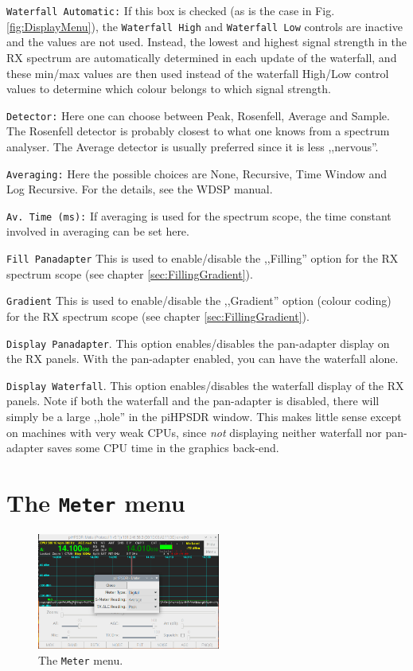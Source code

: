 \documentclass[12pt]{book}
\def\rett#1{\texttt{\color{red}#1}}
\def\bltt#1{\texttt{\color{blue}#1}}
\def\pH{pi\-HPSDR }
\begin{document}
\rett{Waterfall Automatic:} If this box is checked (as is the case in
Fig. \ref{fig:DisplayMenu}), the \rett{Waterfall High} and
\rett{Waterfall Low} controls are inactive and the values are not used. Instead,
the lowest and highest signal strength in the RX spectrum are automatically determined
in each update of the waterfall, and these min/max values
 are then used instead of the waterfall High/Low control values to determine which
 colour belongs to which signal strength.

\rett{Detector:} Here one can choose between Peak, Rosenfell, Average and Sample. The
Rosenfell detector is probably closest to what one knows from a spectrum analyser.
The Average detector is usually preferred since it is less ,,nervous''.

\rett{Averaging:} Here the possible choices are None, Recursive, Time Window and
Log Recursive. For the details, see the WDSP manual.

\rett{Av. Time (ms):} If averaging is used for the spectrum scope, the time
constant involved in averaging can be set here.

\rett{Fill Panadapter} This is used to enable/disable the ,,Filling'' option
for the RX  spectrum scope (see chapter \ref{sec:FillingGradient}).

\rett{Gradient} This is used to enable/disable the ,,Gradient'' option
(colour coding) for the RX spectrum scope (see chapter \ref{sec:FillingGradient}).

\rett{Display Panadapter}. This option enables/disables the pan-adapter display
on the RX panels. With the pan-adapter enabled, you can have the waterfall alone.

 \rett{Display Waterfall}. This option enables/disables the waterfall display
 of the RX panels. Note if both the waterfall and the pan-adapter is disabled,
 there will simply be a large ,,hole'' in the \pH window. This makes little sense
 except on machines with very weak CPUs, since \textit{not} displaying neither waterfall
 nor pan-adapter saves some CPU time in the graphics back-end.


\section{The \texttt{Meter} menu}

\begin{figure}[ht]
\center
\includegraphics[width=6cm]{MeterMenu.png}
\caption{The \bltt{Meter} menu.}
\label{fig:Meter}
\end{figure}
\end{document}
